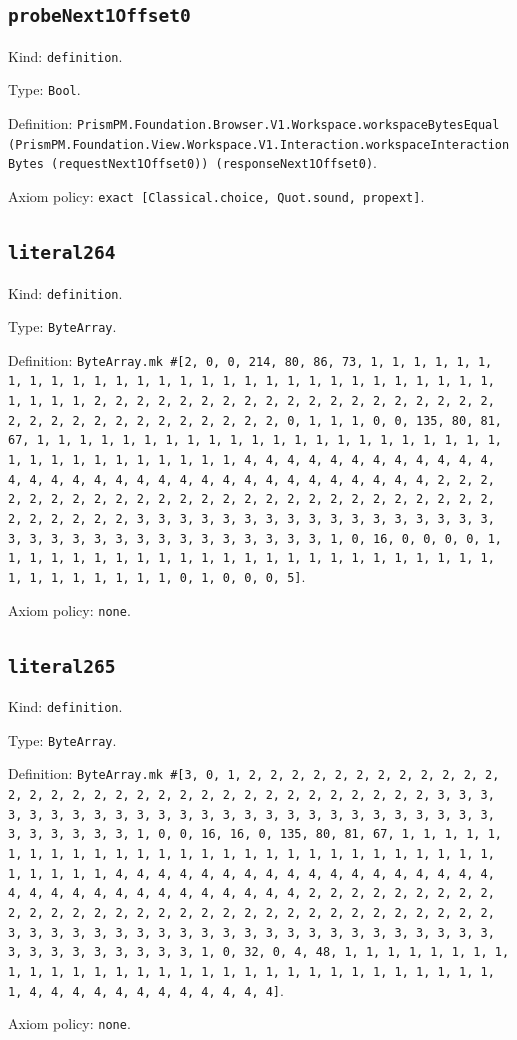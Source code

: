 \documentclass[11pt]{article}
\begin{document}
\subsection*{\texttt{probeNext1Offset0}}
\noindent Kind: \texttt{definition}.\par
\noindent Type: \texttt{Bool}.\par
\noindent Definition: \texttt{PrismPM.Foundation.Browser.V1.Workspace.workspaceBytesEqual (PrismPM.Foundation.View.Workspace.V1.Interaction.workspaceInteractionBytes (requestNext1Offset0)) (responseNext1Offset0)}.\par
\noindent Axiom policy: \texttt{exact [Classical.choice, Quot.sound, propext]}.\par
\subsection*{\texttt{literal264}}
\noindent Kind: \texttt{definition}.\par
\noindent Type: \texttt{ByteArray}.\par
\noindent Definition: \texttt{ByteArray.mk \#[2, 0, 0, 214, 80, 86, 73, 1, 1, 1, 1, 1, 1, 1, 1, 1, 1, 1, 1, 1, 1, 1, 1, 1, 1, 1, 1, 1, 1, 1, 1, 1, 1, 1, 1, 1, 1, 1, 1, 1, 2, 2, 2, 2, 2, 2, 2, 2, 2, 2, 2, 2, 2, 2, 2, 2, 2, 2, 2, 2, 2, 2, 2, 2, 2, 2, 2, 2, 2, 2, 2, 2, 0, 1, 1, 1, 0, 0, 135, 80, 81, 67, 1, 1, 1, 1, 1, 1, 1, 1, 1, 1, 1, 1, 1, 1, 1, 1, 1, 1, 1, 1, 1, 1, 1, 1, 1, 1, 1, 1, 1, 1, 1, 1, 1, 4, 4, 4, 4, 4, 4, 4, 4, 4, 4, 4, 4, 4, 4, 4, 4, 4, 4, 4, 4, 4, 4, 4, 4, 4, 4, 4, 4, 4, 4, 4, 4, 2, 2, 2, 2, 2, 2, 2, 2, 2, 2, 2, 2, 2, 2, 2, 2, 2, 2, 2, 2, 2, 2, 2, 2, 2, 2, 2, 2, 2, 2, 2, 2, 3, 3, 3, 3, 3, 3, 3, 3, 3, 3, 3, 3, 3, 3, 3, 3, 3, 3, 3, 3, 3, 3, 3, 3, 3, 3, 3, 3, 3, 3, 3, 3, 1, 0, 16, 0, 0, 0, 0, 1, 1, 1, 1, 1, 1, 1, 1, 1, 1, 1, 1, 1, 1, 1, 1, 1, 1, 1, 1, 1, 1, 1, 1, 1, 1, 1, 1, 1, 1, 1, 1, 0, 1, 0, 0, 0, 5]}.\par
\noindent Axiom policy: \texttt{none}.\par
\subsection*{\texttt{literal265}}
\noindent Kind: \texttt{definition}.\par
\noindent Type: \texttt{ByteArray}.\par
\noindent Definition: \texttt{ByteArray.mk \#[3, 0, 1, 2, 2, 2, 2, 2, 2, 2, 2, 2, 2, 2, 2, 2, 2, 2, 2, 2, 2, 2, 2, 2, 2, 2, 2, 2, 2, 2, 2, 2, 2, 2, 2, 3, 3, 3, 3, 3, 3, 3, 3, 3, 3, 3, 3, 3, 3, 3, 3, 3, 3, 3, 3, 3, 3, 3, 3, 3, 3, 3, 3, 3, 3, 3, 3, 1, 0, 0, 16, 16, 0, 135, 80, 81, 67, 1, 1, 1, 1, 1, 1, 1, 1, 1, 1, 1, 1, 1, 1, 1, 1, 1, 1, 1, 1, 1, 1, 1, 1, 1, 1, 1, 1, 1, 1, 1, 1, 1, 4, 4, 4, 4, 4, 4, 4, 4, 4, 4, 4, 4, 4, 4, 4, 4, 4, 4, 4, 4, 4, 4, 4, 4, 4, 4, 4, 4, 4, 4, 4, 4, 2, 2, 2, 2, 2, 2, 2, 2, 2, 2, 2, 2, 2, 2, 2, 2, 2, 2, 2, 2, 2, 2, 2, 2, 2, 2, 2, 2, 2, 2, 2, 2, 3, 3, 3, 3, 3, 3, 3, 3, 3, 3, 3, 3, 3, 3, 3, 3, 3, 3, 3, 3, 3, 3, 3, 3, 3, 3, 3, 3, 3, 3, 3, 3, 1, 0, 32, 0, 4, 48, 1, 1, 1, 1, 1, 1, 1, 1, 1, 1, 1, 1, 1, 1, 1, 1, 1, 1, 1, 1, 1, 1, 1, 1, 1, 1, 1, 1, 1, 1, 1, 1, 4, 4, 4, 4, 4, 4, 4, 4, 4, 4, 4, 4]}.\par
\noindent Axiom policy: \texttt{none}.\par
\end{document}
